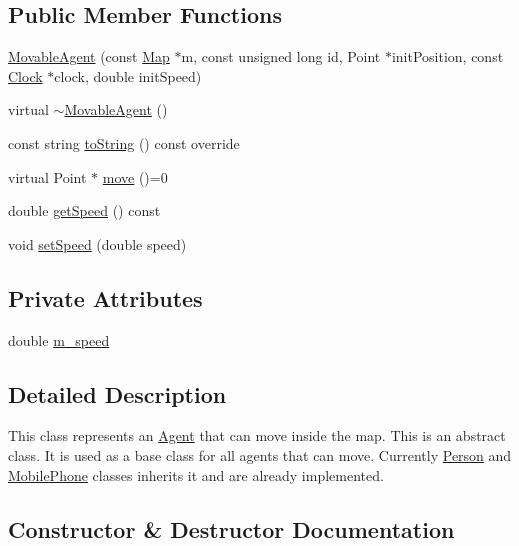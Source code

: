 \subsection*{Public Member Functions}
\begin{DoxyCompactItemize}
\item 
\hyperlink{class_movable_agent_ad76b14a044181a57ade71f1267a2ccbd}{Movable\+Agent} (const \hyperlink{class_map}{Map} $\ast$m, const unsigned long id, Point $\ast$init\+Position, const \hyperlink{class_clock}{Clock} $\ast$clock, double init\+Speed)
\item 
virtual \hyperlink{class_movable_agent_a20eb9ddcc953137e63e035837918206c}{$\sim$\+Movable\+Agent} ()
\item 
const string \hyperlink{class_movable_agent_a1dee2a6bf93f01006fadfb6fba6c9a59}{to\+String} () const override
\item 
virtual Point $\ast$ \hyperlink{class_movable_agent_a88b617f0e78c817634e5b587da045ab0}{move} ()=0
\item 
double \hyperlink{class_movable_agent_a12fcdaee60f5bb29f15fe113a7dacaac}{get\+Speed} () const
\item 
void \hyperlink{class_movable_agent_ae2ef452e81789a4370e7dee32a9cc67e}{set\+Speed} (double speed)
\end{DoxyCompactItemize}
\subsection*{Private Attributes}
\begin{DoxyCompactItemize}
\item 
double \hyperlink{class_movable_agent_ac725b42e7b968740a59c3e1033d69ac5}{m\+\_\+speed}
\end{DoxyCompactItemize}


\subsection{Detailed Description}
This class represents an \hyperlink{class_agent}{Agent} that can move inside the map. This is an abstract class. It is used as a base class for all agents that can move. Currently \hyperlink{class_person}{Person} and \hyperlink{class_mobile_phone}{Mobile\+Phone} classes inherits it and are already implemented. 

\subsection{Constructor \& Destructor Documentation}
\mbox{\label{class_movable_agent_ad76b14a044181a57ade71f1267a2ccbd}} 
